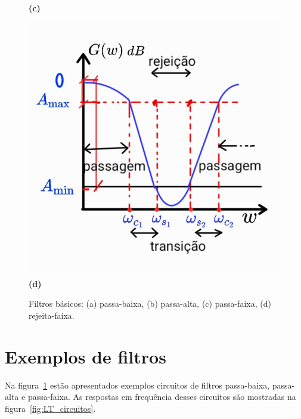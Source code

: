 \begin{figure}[h!]
\begin{minipage}[b]{0.32\linewidth}
        \centering
        \\ \textbf{(c)}
    \end{minipage}
    \begin{minipage}[b]{0.32\linewidth}
        \includegraphics[width=\linewidth]{figuras/rejeita_faixa_real.png}
        \centering
        \\ \textbf{(d)}
    \end{minipage}
    \caption{Filtros básicos: (a) passa-baixa, (b) passa-alta, (c) passa-faixa, (d) rejeita-faixa.}
    \label{fig:filtros_reais}
\end{figure}

\section{Exemplos de filtros}

Na figura~\ref{fig:filtros_reais} estão apresentados exemplos circuitos de filtros passa-baixa, passa-alta e passa-faixa. As respostas em frequência desses circuitos são mostradas na figura~\ref{fig:LT_circuitos}.

